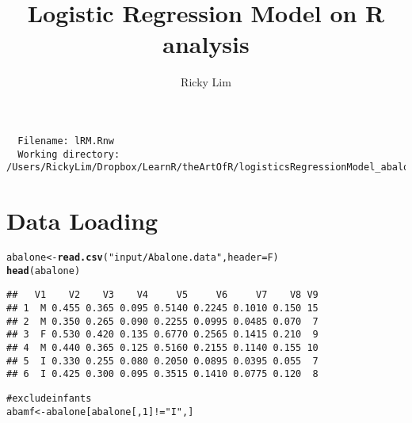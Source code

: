 \documentclass{article}\usepackage{graphicx, color}
\makeatletter
\newcommand{\hlfunctioncall}[1]{\textcolor[rgb]{0.501960784313725,0,0.329411764705882}{\textbf{#1}}}%
\newcommand{\hlstring}[1]{\textcolor[rgb]{0.6,0.6,1}{#1}}%
\newcommand{\hlcomment}[1]{\textcolor[rgb]{0.180392156862745,0.6,0.341176470588235}{#1}}%
\newenvironment{kframe}{%
 \def\at@end@of@kframe{}%
 \ifinner\ifhmode%
  \def\at@end@of@kframe{\end{minipage}}%
  \begin{minipage}{\columnwidth}%
 \fi\fi%
 \def\FrameCommand##1{\hskip\@totalleftmargin \hskip-\fboxsep
 \colorbox{shadecolor}{##1}\hskip-\fboxsep
     \hskip-\linewidth \hskip-\@totalleftmargin \hskip\columnwidth}%
 \MakeFramed {\advance\hsize-\width
   \@totalleftmargin\z@ \linewidth\hsize
   \@setminipage}}%
 {\par\unskip\endMakeFramed%
 \at@end@of@kframe}
\newenvironment{knitrout}{}{} %
\makeatother
\begin{document}
\author{Ricky Lim}
\title{Logistic Regression Model on R analysis}

\maketitle                                    


\begin{verbatim}
  Filename: lRM.Rnw 
  Working directory: /Users/RickyLim/Dropbox/LearnR/theArtOfR/logisticsRegressionModel_abalone 
\end{verbatim}

\section{Data Loading}
\begin{knitrout}
\color{fgcolor}\begin{kframe}
\begin{alltt}
abalone <- \hlfunctioncall{read.csv}(\hlstring{"input/Abalone.data"}, header = F)
\hlfunctioncall{head}(abalone)
\end{alltt}
\begin{verbatim}
##   V1    V2    V3    V4     V5     V6     V7    V8 V9
## 1  M 0.455 0.365 0.095 0.5140 0.2245 0.1010 0.150 15
## 2  M 0.350 0.265 0.090 0.2255 0.0995 0.0485 0.070  7
## 3  F 0.530 0.420 0.135 0.6770 0.2565 0.1415 0.210  9
## 4  M 0.440 0.365 0.125 0.5160 0.2155 0.1140 0.155 10
## 5  I 0.330 0.255 0.080 0.2050 0.0895 0.0395 0.055  7
## 6  I 0.425 0.300 0.095 0.3515 0.1410 0.0775 0.120  8
\end{verbatim}
\begin{alltt}

\hlcomment{# exclude infants}
abamf <- abalone[abalone[, 1] != \hlstring{"I"}, ]
\end{alltt}
\end{kframe}
\end{knitrout}
\end{document}
